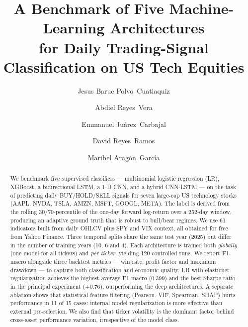 \documentclass[runningheads]{llncs}
\begin{document}
\title{A Benchmark of Five Machine-Learning Architectures \\for Daily Trading-Signal Classification on US Tech Equities}


\author{Jesus Baruc Polvo~Cuatiaquiz \and
Abdiel Reyes~Vera \and
Emmanuel Ju\'arez~Carbajal \and
David Reyes~Ramos \and
Maribel Arag\'on~Garc\'ia}



\maketitle

\begin{abstract}
We benchmark five supervised classifiers --- multinomial logistic regression (LR), XGBoost, a bidirectional LSTM, a 1-D CNN, and a hybrid CNN-LSTM --- on the task of predicting daily BUY/HOLD/SELL signals for seven large-cap US technology stocks (AAPL, NVDA, TSLA, AMZN, MSFT, GOOGL, META). The label is derived from the rolling 30/70-percentile of the one-day forward log-return over a 252-day window, producing an adaptive ground truth that is robust to bull/bear regimes. We use 61 indicators built from daily OHLCV plus SPY and VIX context, all obtained for free from Yahoo Finance. Three temporal splits share the same test year (2025) but differ in the number of training years (10, 6 and 4). Each architecture is trained both \emph{globally} (one model for all tickers) and \emph{per ticker}, yielding 120 controlled runs. We report F1-macro alongside three backtest metrics --- win rate, profit factor and maximum drawdown --- to capture both classification and economic quality. LR with elasticnet regularization achieves the highest average F1-macro (0.399) and the best Sharpe ratio in the principal experiment (+0.76), outperforming the deep architectures. A separate ablation shows that statistical feature filtering (Pearson, VIF, Spearman, SHAP) hurts performance in 11 of 15 cases: internal model regularization is more effective than external pre-selection. We also find that ticker volatility is the dominant factor behind cross-asset performance variation, irrespective of the model class.
\end{abstract}
\end{document}
